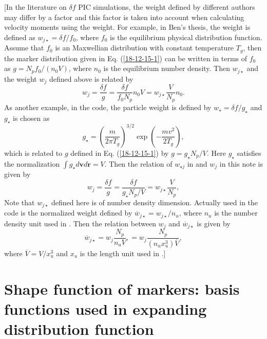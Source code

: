 \documentclass{article}
\newcommand{\tmtexttt}[1]{{\ttfamily{#1}}}
\begin{document}
[In the literature on $\delta f$ PIC simulations, the weight defined by
different authors may differ by a factor and this factor is taken into account
when calculating velocity moments using the weight. For example, in Ben's
thesis{\cite{ben2016}}, the weight is defined as $w_{j \star} = \delta f /
f_0$, where $f_0$ is the equilibrium physical distribution function. Assume
that $f_0$ is an Maxwellian distribution with constant temperature $T_g$, then
the marker distribution given in Eq. (\ref{18-12-15-1}) can be written in
terms of $f_0$ as $g = N_p f_0 / (n_0 V)$, where $n_0$ is the equilibrium
number density. Then $w_{j \star}$ and the weight $w_j$ defined above is
related by
\begin{equation}
  w_j = \frac{\delta f}{g} = \frac{\delta f}{f_0 N_p} n_0 V = w_{j \star}
  \frac{V}{N_p} n_0 .
\end{equation}
As another example, in the \tmtexttt{GEM} code, the particle weight is defined
by $w_{\star} = \delta f / g_{\star}$ and $g_{\star}$ is chosen as
\begin{equation}
  g_{\star} = \left( \frac{m}{2 \pi T_g} \right)^{3 / 2} \exp \left( - \frac{m
  v^2}{2 T_g} \right),
\end{equation}
which is related to $g$ defined in Eq. (\ref{18-12-15-1}) by $g = g_{\star}
N_p / V$. Here $g_{\star}$ satisfies the normalization $\int g_{\star}
d\mathbf{v}d\mathbf{r}= V$. Then the relation of $w_{\star j}$ in
\tmtexttt{GEM} and $w_j$ in this note is given by
\begin{equation}
  w_j = \frac{\delta f}{g} = \frac{\delta f}{g_{\star} N_p / V} = w_{j \star}
  \frac{V}{N_p},
\end{equation}
Note that $w_{j \star}$ defined here is of number density dimension. Actually
used in the code is the normalized weight defined by $\overline{w}_{j \star} =
w_{j \star} / n_u$, where $n_u$ is the number density unit used in
\tmtexttt{GEM}. Then the relation between $w_j$ and $\overline{w}_{j \star}$
is given by
\begin{equation}
  \overline{w}_{j \star} = w_j \frac{N_p}{n_u V}, = w_j \frac{N_p}{(n_u x_u^3)
  \overline{V}},
\end{equation}
where $\overline{V} = V / x_u^3$ and $x_u$ is the length unit used in
\tmtexttt{GEM}.]

\section{Shape function of markers: basis functions used in expanding
distribution function}\label{17-6-13-1}\label{16-3-29-a5}
\end{document}

